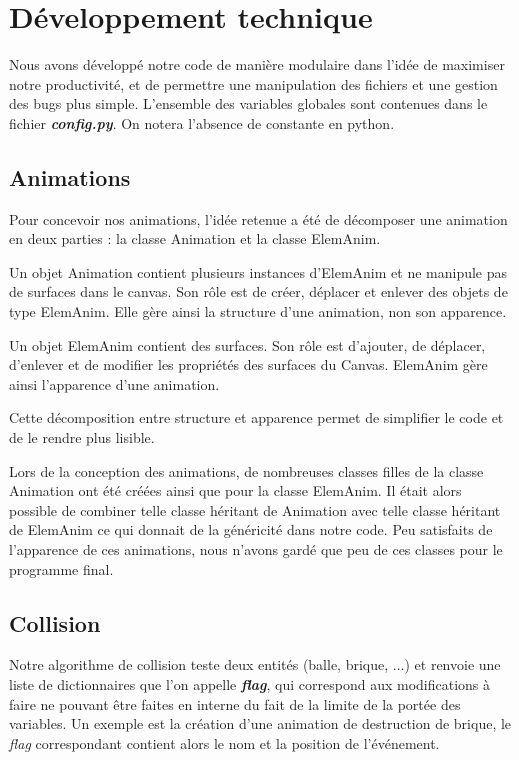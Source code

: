 \section{Développement technique}
  Nous avons développé notre code de manière modulaire dans l'idée de maximiser notre productivité, et de permettre une manipulation des fichiers et une gestion des bugs plus simple. L'ensemble des variables globales sont contenues dans le fichier {\bf \em config.py}. On notera l'absence de constante en python.
    
  \subsection{Animations}
  Pour concevoir nos animations, l'idée retenue a été de décomposer une animation en deux parties : la classe Animation et la classe ElemAnim.
	

	Un objet Animation contient plusieurs instances d'ElemAnim et ne manipule pas de surfaces dans le canvas. Son rôle est de créer, déplacer et enlever des objets de type ElemAnim. Elle gère ainsi la structure d'une animation, non son apparence.

    Un objet ElemAnim contient des surfaces. Son rôle est d'ajouter, de déplacer, d'enlever et de modifier les propriétés des surfaces du Canvas. ElemAnim gère ainsi l'apparence d'une animation.

    Cette décomposition entre structure et apparence permet de simplifier le code et de le rendre plus lisible.

    Lors de la conception des animations, de nombreuses classes filles de la classe Animation ont été créées ainsi que pour la classe ElemAnim. Il était alors possible de combiner telle classe héritant de Animation avec telle classe héritant de ElemAnim ce qui donnait de la généricité dans notre code.
    Peu satisfaits de l'apparence de ces animations, nous n'avons gardé que peu de ces classes pour le programme final.
	
  \subsection{Collision}
	
  Notre algorithme de collision teste deux entités (balle, brique, ...) et renvoie une liste de dictionnaires que l'on appelle {\em \bf flag}, qui correspond aux modifications à faire ne pouvant être faites en interne du fait de la limite de la portée des variables. Un exemple est la création d'une animation de destruction de brique, le {\em flag} correspondant contient alors le nom et la position de l'événement.

